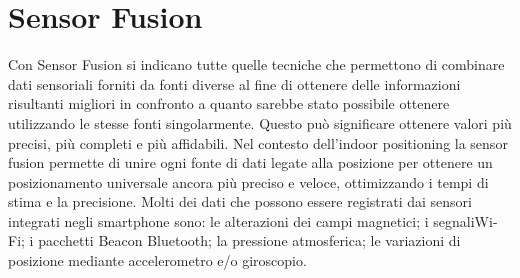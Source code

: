 \section{Sensor Fusion}

Con Sensor Fusion \cite{IPS2} si indicano tutte quelle tecniche che permettono di combinare dati sensoriali forniti da fonti diverse al fine di ottenere delle informazioni risultanti migliori in confronto a quanto sarebbe stato possibile ottenere utilizzando le stesse fonti singolarmente. Questo può significare ottenere valori più precisi, più completi e più affidabili.
Nel contesto dell’indoor positioning la sensor fusion permette di unire ogni fonte
di dati legate alla posizione per ottenere un posizionamento universale ancora più preciso
e veloce, ottimizzando i tempi di stima e la precisione.
Molti dei dati che possono essere registrati dai sensori integrati negli smartphone
sono: le alterazioni dei campi magnetici; i segnaliWi-Fi; i pacchetti Beacon Bluetooth; la
pressione atmosferica; le variazioni di posizione mediante accelerometro e/o giroscopio.





